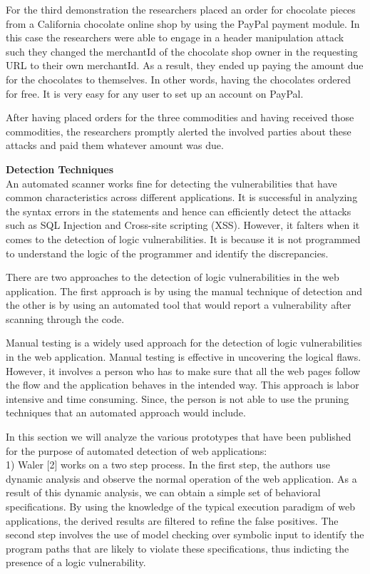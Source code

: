 \documentclass[11pt]{article}
\begin{document}
 For the third demonstration the researchers placed an order for chocolate pieces from a California chocolate online shop by using the PayPal payment module. In this case the researchers were able to engage in a header manipulation attack such they changed the merchantId of the chocolate shop owner in the requesting URL to their own merchantId. As a result, they ended up paying the amount due for the chocolates to themselves. In other words, having the chocolates ordered for free. It is very easy for any user to set up an account on PayPal.
 
 After having placed orders for the three commodities and having received those commodities, the researchers promptly alerted the involved parties about these attacks and paid them whatever amount was due.

\textbf{Detection Techniques}\\
 An automated scanner works fine for detecting the vulnerabilities that have common characteristics across different applications. It is successful in analyzing the syntax errors in the statements and hence can efficiently detect the attacks such as SQL Injection and Cross-site scripting (XSS). However, it falters when it comes to the detection of logic vulnerabilities. It is because it is not programmed to understand the logic of the programmer and identify the discrepancies.
 
 There are two approaches to the detection of logic vulnerabilities in the web application. The first approach is by using the manual technique of detection and the other is by using an automated tool that would report a vulnerability after scanning through the code.
 
 Manual testing is a widely used approach for the detection of logic vulnerabilities in the web application. Manual testing is effective in uncovering the logical flaws. However, it involves a person who has to make sure that all the web pages follow the flow and the application behaves in the intended way. This approach is labor intensive and time consuming. Since, the person is not able to use the pruning techniques that an automated approach would include.
 
 In this section we will analyze the various prototypes that have been published for the purpose of automated detection of web applications:\\
 1) Waler [2] works on a two step process. In the first step, the authors use dynamic analysis and observe the normal operation of the web application. As a result of this dynamic analysis, we can obtain a simple set of behavioral specifications. By using the knowledge of the typical execution paradigm of web applications, the derived results are filtered to refine the false positives. The second step involves the use of model checking over symbolic input to identify the program paths that are likely to violate these specifications, thus indicting the presence of a logic vulnerability. 
\end{document}
